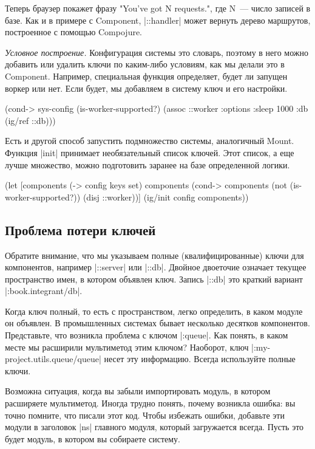 Теперь браузер покажет фразу "You've got N requests.", где N~--- число записей в
базе. Как и в примере с Component, \spverb|::handler| может вернуть дерево маршрутов,
построенное с помощью Compojure.

\emph{Условное построение.} Конфигурация системы это словарь, поэтому в него можно
добавить или удалить ключи по каким-либо условиям, как мы делали это в
Component. Например, специальная функция определяет, будет ли запущен воркер или
нет. Если будет, мы добавляем в систему ключ и его настройки.

\begin{code}
(cond-> sys-config
  (is-worker-supported?)
  (assoc ::worker {:options {:sleep 1000}
                   :db (ig/ref ::db)}))
\end{code}

Есть и другой способ запустить подмножество системы, аналогичный Mount. Функция
\spverb|init| принимает необязательный список ключей. Этот список, а еще лучше
множество, можно подготовить заранее на базе определенной логики.

\begin{code}
(let [components (-> config keys set)
      components (cond-> components
                   (not (is-worker-supported?))
                   (disj ::worker))]
  (ig/init config components))
\end{code}

\subsection{Проблема потери ключей}

Обратите внимание, что мы указываем полные (квалифицированные) ключи для
компонентов, например \spverb|::server| или \spverb|::db|. Двойное двоеточие означает текущее
пространство имен, в котором объявлен ключ. Запись \spverb|::db| это краткий вариант
\spverb|:book.integrant/db|.

Когда ключ полный, то есть с пространством, легко определить, в каком модуле он
объявлен. В промышленных системах бывает несколько десятков
компонентов. Представьте, что возникла проблема с ключом \spverb|:queue|. Как понять, в
каком месте мы расширили мультиметод этим ключом? Наоборот, ключ
\spverb|:my-project.utils.queue/queue| несет эту информацию. Всегда используйте полные
ключи.

Возможна ситуация, когда вы забыли импортировать модуль, в котором расширяете
мультиметод. Иногда трудно понять, почему возникла ошибка: вы точно помните, что
писали этот код. Чтобы избежать ошибки, добавьте эти модули в заголовок \spverb|ns|
главного модуля, который загружается всегда. Пусть это будет модуль, в котором
вы собираете систему.

